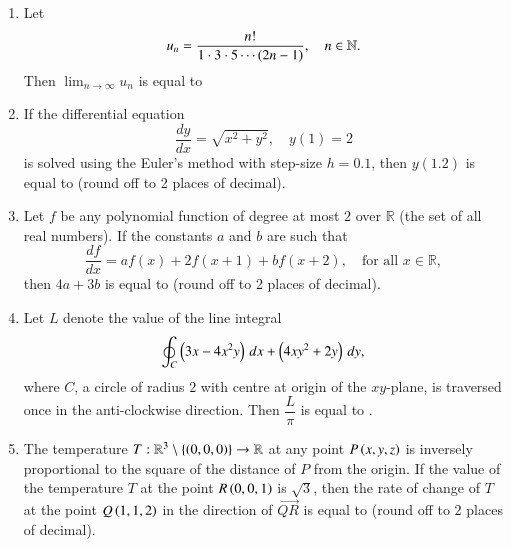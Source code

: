 \documentclass[journal,12pt,onecolumn]{IEEEtran}
\theoremstyle{remark}
\begin{document}
\begin{enumerate}[start=1, label=Q.\arabic*]
\hfill{}


\item Let 
\[
u_n=\frac{n!}{1\cdot 3 \cdot 5 \cdots \left(2n-1\right)}, \quad n\in \mathbb{N}.
\]
Then $\lim_{n\to\infty} u_n$ is equal to \underline{\hspace{2cm}}

\hfill{}

\item If the differential equation
\[
\frac{dy}{dx} = \sqrt{x^2 + y^2}, \quad y(1)=2
\]
is solved using the Euler’s method with step-size $h=0.1$, then $y(1.2)$ is equal to \underline{\hspace{2cm}} (round off to 2 places of decimal).

\hfill{}


\item Let $f$ be any polynomial function of degree at most $2$ over $\mathbb{R}$ (the set of all real numbers).  
If the constants $a$ and $b$ are such that
\[
\frac{df}{dx} = a f(x) + 2f(x+1) + b f(x+2), \quad \text{for all } x \in \mathbb{R},
\]
then $4a+3b$ is equal to \underline{\hspace{2cm}} (round off to 2 places of decimal).

\hfill{}


\item Let $L$ denote the value of the line integral
\[
\oint_C \left(3x - 4x^2 y\right)\,dx + \left(4xy^2 + 2y\right)\,dy,
\]
where $C$, a circle of radius $2$ with centre at origin of the $xy$-plane, is traversed once in the anti-clockwise direction. Then $\dfrac{L}{\pi}$ is equal to \underline{\hspace{2cm}}.

\hfill{}
\item The temperature $T : \mathbb{R}^3 \setminus \{\left(0,0,0\right)\} \to \mathbb{R}$ at any point $P\left(x,y,z\right)$ is inversely proportional to the square of the distance of $P$ from the origin. If the value of the temperature $T$ at the point $R\left(0,0,1\right)$ is $\sqrt{3}$, then the rate of change of $T$ at the point $Q\left(1,1,2\right)$ in the direction of $\overrightarrow{QR}$ is equal to \underline{\hspace{2cm}} (round off to 2 places of decimal).  



\end{enumerate}
\end{document}
